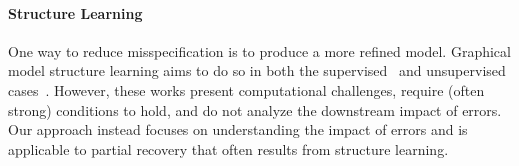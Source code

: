 \paragraph{Structure Learning}
One way to reduce misspecification is to produce a more refined model. Graphical model structure learning aims to do so in both the supervised~\citep{Ravikumar11, Loh13} and unsupervised cases~\citep{Chandrasekaran12,Meng14, bach2017learning, varma2019learning}. However, these works present computational challenges, require (often strong) conditions to hold, and do not analyze the downstream impact of errors. Our approach instead focuses on understanding the impact of errors and is applicable to partial recovery that often results from structure learning.




